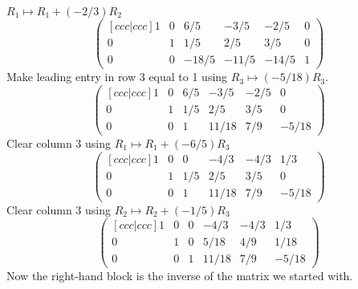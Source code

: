 \documentclass{article}
\begin{document}
\begin{Example}
\(R_1\mapsto R_1+(-2/3)R_2\)\[\begin{pmatrix}[ c c c | c c c ] 1 & 0
& 6/5 & -3/5 & -2/5 & 0 \\ 0 & 1 & 1/5 & 2/5 & 3/5 & 0 \\ 0 & 0 &
-18/5 & -11/5 & -14/5 & 1 \end{pmatrix}\]Make leading entry in row 3
equal to 1 using \(R_3\mapsto (-5/18)R_3\). \[\begin{pmatrix}[ c c
c | c c c ] 1 & 0 & 6/5 & -3/5 & -2/5 & 0 \\ 0 & 1 & 1/5 & 2/5 & 3/5
& 0 \\ 0 & 0 & 1 & 11/18 & 7/9 & -5/18 \end{pmatrix}\]Clear column 3
using \(R_1\mapsto R_1+(-6/5)R_3\)\[\begin{pmatrix}[ c c c | c c c ]
1 & 0 & 0 & -4/3 & -4/3 & 1/3 \\ 0 & 1 & 1/5 & 2/5 & 3/5 & 0 \\ 0 &
0 & 1 & 11/18 & 7/9 & -5/18 \end{pmatrix}\] Clear column 3 using
\(R_2\mapsto R_2+(-1/5)R_3\)\[\begin{pmatrix}[ c c c | c c c ] 1 & 0
& 0 & -4/3 & -4/3 & 1/3 \\ 0 & 1 & 0 & 5/18 & 4/9 & 1/18 \\ 0 & 0 &
1 & 11/18 & 7/9 & -5/18 \end{pmatrix}\] Now the right-hand block is
the inverse of the matrix we started with.


\end{Example}
\end{document}
